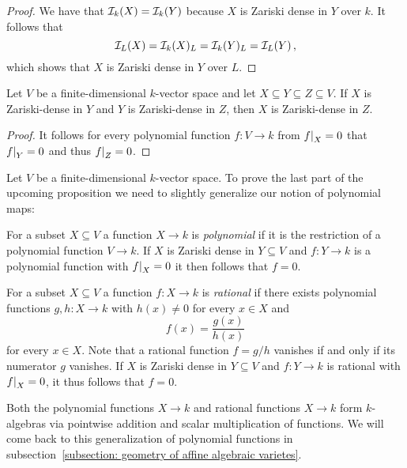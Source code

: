\begin{proof}
  We have that $\mathcal{I}_k(X) = \mathcal{I}_k(Y)$ because $X$ is Zariski dense in $Y$ over $k$.
  It follows that
  \[
      \mathcal{I}_L(X)
    = \mathcal{I}_k(X)_L
    = \mathcal{I}_k(Y)_L
    = \mathcal{I}_L(Y) \,,
  \]
  which shows that $X$ is Zariski dense in $Y$ over $L$.
\end{proof}


\begin{lemma}
  \label{lemma: transitivity of Zariski density}
  Let $V$ be a finite-dimensional $k$-vector space and let $X \subseteq Y \subseteq Z \subseteq V$.
  If $X$ is Zariski-dense in $Y$ and $Y$ is Zariski-dense in $Z$, then $X$ is Zariski-dense in $Z$.
\end{lemma}


\begin{proof}
  It follows for every polynomial function $f \colon V \to k$ from $\restrict{f}{X} = 0$ that $\restrict{f}{Y} = 0$ and thus $\restrict{f}{Z} = 0$.
\end{proof}


\begin{fluff}
  Let $V$ be a finite-dimensional $k$-vector space.
  To prove the last part of the upcoming proposition we need to slightly generalize our notion of polynomial maps:
  
  For a subset $X \subseteq V$ a function $X \to k$ is \emph{polynomial} if it is the restriction of a polynomial function $V \to k$.
  If $X$ is Zariski dense in $Y \subseteq V$ and $f \colon Y \to k$ is a polynomial function with $\restrict{f}{X} = 0$ it then follows that $f = 0$.
  
  For a subset $X \subseteq V$ a function $f \colon X \to k$ is \emph{rational} if there exists polynomial functions $g, h \colon X \to k$ with $h(x) \neq 0$ for every $x \in X$ and
  \[
      f(x)
    = \frac{g(x)}{h(x)}
  \]
  for every $x \in X$.
  Note that a rational function $f = g/h$ vanishes if and only if its numerator $g$ vanishes.
  If $X$ is Zariski dense in $Y \subseteq V$ and $f \colon Y \to k$ is rational with $\restrict{f}{X} = 0$, it thus follows that $f = 0$.
  
  Both the polynomial functions $X \to k$ and rational functions $X \to k$ form $k$-algebras via pointwise addition and scalar multiplication of functions.
  We will come back to this generalization of polynomial functions in subsection~\ref{subsection: geometry of affine algebraic varietes}.
\end{fluff}


